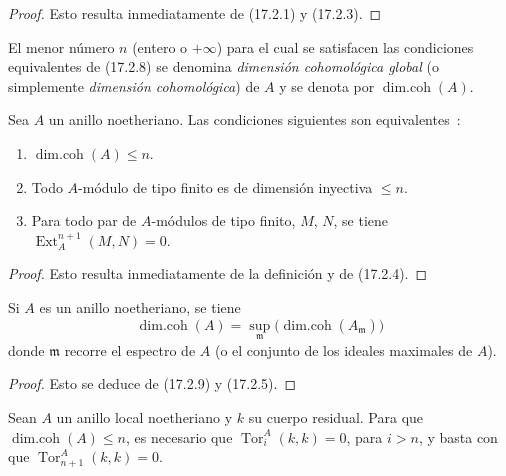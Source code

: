 \begin{proof}
Esto resulta inmediatamente de (17.2.1) y (17.2.3).
\end{proof}

El menor número $n$ (entero o $+\infty$) para el cual se satisfacen las condiciones
equivalentes de (17.2.8) se denomina \emph{dimensión cohomológica
global} (o simplemente \emph{dimensión cohomológica}) de $A$
y se denota por $\operatorname{dim.coh}(A)$.

\begin{proposition}[17.2.9]
\label{0.17.2.9-fr}
Sea $A$ un anillo noetheriano. Las condiciones siguientes son equivalentes~:
\begin{enumerate}
  \item[\rm a)] $\operatorname{dim.coh}(A)\leq n$.
  \item[\rm b)] Todo $A$-módulo de tipo finito es de dimensión inyectiva
  $\leq n$.
  \item[\rm c)] Para todo par de $A$-módulos de tipo finito, $M$, $N$, se tiene
  $\operatorname{Ext}^{n+1}_A(M,N)=0$.
\end{enumerate}
\end{proposition}

\begin{proof}
Esto resulta inmediatamente de la definición y de (17.2.4).
\end{proof}

\begin{corollary}[17.2.10]
\label{0.17.2.10-fr}
Si $A$ es un anillo noetheriano, se tiene
\begin{equation}
\label{0.17.2.10.1-fr}
\tag{17.2.10.1}
  \operatorname{dim.coh}(A)
  =\sup_{\mathfrak{m}}
  \bigl(\operatorname{dim.coh}(A_{\mathfrak{m}})\bigr)
\end{equation}
donde $\mathfrak{m}$ recorre el espectro de $A$ \textup{(}o el conjunto de los ideales
maximales de $A$\textup{)}.
\end{corollary}

\begin{proof}
Esto se deduce de (17.2.9) y (17.2.5).
\end{proof}

\begin{proposition}[17.2.11]
\label{0.17.2.11-fr}
Sean $A$ un anillo local noetheriano y $k$ su cuerpo residual. Para que
$\operatorname{dim.coh}(A)\leq n$, es necesario que
$\operatorname{Tor}^A_i(k,k)=0$, para $i>n$, y basta con que
$\operatorname{Tor}^A_{n+1}(k,k)=0$.
\end{proposition}

